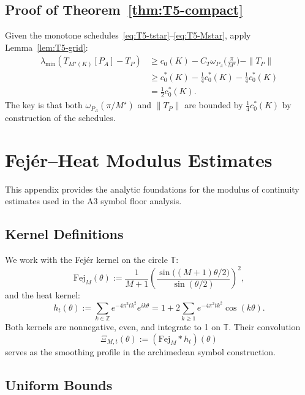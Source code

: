 \subsection{Proof of Theorem~\ref{thm:T5-compact}}

Given the monotone schedules~\eqref{eq:T5-tstar}--\eqref{eq:T5-Mstar}, apply Lemma~\ref{lem:T5-grid}:
\begin{align}
  \lambda_{\min}(T_{M^\star(K)}[P_A] - T_P) &\geq c_0(K) - C_T \omega_{P_A}\!\big(\tfrac{\pi}{M^\star}\big) - \|T_P\| \\
  &\geq c_0^\ast(K) - \tfrac{1}{4}c_0^\ast(K) - \tfrac{1}{4}c_0^\ast(K) \\
  &= \tfrac{1}{2}c_0^\ast(K).
\end{align}
The key is that both $\omega_{P_A}(\pi/M^\star)$ and $\|T_P\|$ are bounded by $\frac{1}{4}c_0^\ast(K)$ by construction of the schedules.

\section{Fej\'er--Heat Modulus Estimates}\label{app:fejer-heat}

This appendix provides the analytic foundations for the modulus of continuity estimates used in the A3 symbol floor analysis.

\subsection{Kernel Definitions}

We work with the Fej\'er kernel on the circle $\mathbb{T}$:
\begin{equation}
  \mathrm{Fej}_M(\theta) := \frac{1}{M+1} \left( \frac{\sin\big((M+1)\theta/2\big)}{\sin(\theta/2)} \right)^2,
\end{equation}
and the heat kernel:
\begin{equation}
  h_t(\theta) := \sum_{k \in \mathbb{Z}} e^{-4\pi^2 t k^2} e^{ik\theta} = 1 + 2\sum_{k \geq 1} e^{-4\pi^2 t k^2} \cos(k\theta).
\end{equation}
Both kernels are nonnegative, even, and integrate to 1 on $\mathbb{T}$. Their convolution
\begin{equation}
  \Xi_{M,t}(\theta) := (\mathrm{Fej}_M * h_t)(\theta)
\end{equation}
serves as the smoothing profile in the archimedean symbol construction.

\subsection{Uniform Bounds}

